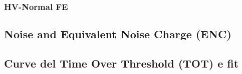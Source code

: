 \documentclass[10pt,a4paper,twoside]{report}
\begin{document}
\subsubsection{HV-Normal FE}

\begin{comment}
Il quarto ed ultimo flavor \textbf{HV-Normal} comprende 512 righe (0-511) per 32 colonne (448 -479) per un totale di 16384 pixel. Anche qui i registri sono stati settati ai valori riportati in tabella (ref). Di seguito in figura (ref), la S-curve su tutti i pixel e anche qui possiamo vedere diverso rumore a pixel noisy, non mascherati. In quest'ultimo flavor inoltre, le ultime 16 colonne non erano funzionanti, queste hanno restituito un picco di threshold a zero che è stato escluso dal plot della distribuzione delle threshold. Dunque in realtà in quest'ultimo pezzo della matrice, i pixel studiati sono stati la metà, ossia 8192.

\begin{figure}
\centering
\texttt{[image: all\_HV\_thscan\_140]}
\caption{S-curves di tutti i pixel del flavor HV Cascode della matrice con un impulso di iniezione di 140 DAC.}
\label{hv_scurve_140}
\end{figure}


Di seguito in figura (ref), i fit delle distribuzioni delle threshold per i due diversi impulsi di iniezione.

\begin{figure}
\centering
\subfigure[VH = 140 DAC]
{\texttt{[image: all\_HV\_thdist\_140]}}\quad
\subfigure[VH = 200 DAC]
{\includegraphics[scale=0.6{all_HV_thdist_200}}\\
\caption{Distribuzioni delle threshold prima della saturazione e alla saturazione massima.}
\label{thdist_hvc}
\end{figure}



\end{comment}


\subsection{Noise and Equivalent Noise Charge (ENC)}

\subsection{Curve del Time Over Threshold (TOT) e fit}
\end{document}
